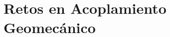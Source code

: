 \section{Retos en Acoplamiento Geomecánico}~\hypertarget{sec:sec240}{}
\label{sec:sec240}








\bigskip
